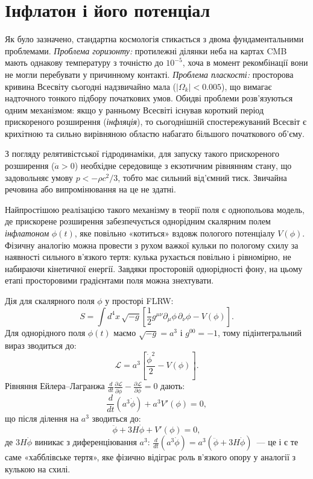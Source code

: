 \documentclass[12pt, a4paper]{article}
\begin{document}
\section{Інфлатон і його потенціал}
\label{sec:inflaton}

Як було зазначено, стандартна космологія стикається
з двома фундаментальними проблемами. \emph{Проблема горизонту:}
протилежні ділянки неба на картах CMB мають однакову температуру
з точністю до $10^{-5}$, хоча в момент рекомбінації вони не могли
перебувати у причинному контакті. \emph{Проблема пласкості:}
просторова кривина Всесвіту сьогодні надзвичайно мала
($|\Omega_k| < 0.005$), що вимагає надточного тонкого підбору
початкових умов. Обидві проблеми розв'язуються одним механізмом:
якщо у ранньому Всесвіті існував короткий період прискореного
розширення (\emph{інфляція}), то сьогоднішній спостережуваний
Всесвіт є крихітною та сильно вирівняною областю набагато більшого
початкового об'єму.

З погляду релятивістської гідродинаміки, для запуску такого прискореного
розширення ($\ddot{a} > 0$) необхідне середовище з екзотичним рівнянням
стану, що задовольняє умову $p < -\rho c^2 / 3$, тобто має сильний
від'ємний тиск. Звичайна речовина або випромінювання на це не здатні.

Найпростішою реалізацією такого механізму в теорії поля є однопольова
модель, де прискорене розширення забезпечується однорідним скалярним
полем \emph{інфлатоном} $\phi(t)$, яке повільно «котиться» вздовж
пологого потенціалу $V(\phi)$. Фізичну аналогію можна провести з
рухом важкої кульки по пологому схилу за наявності сильного
в'язкого тертя: кулька рухається повільно і рівномірно, не
набираючи кінетичної енергії. Завдяки просторовій однорідності
фону, на цьому етапі просторовими градієнтами поля можна знехтувати.

Дія для скалярного поля $\phi$ у просторі FLRW:
\begin{equation}\label{eq:inflaton_action}
  S = \int d^4x\,\sqrt{-g}\left[\frac{1}{2}g^{\mu\nu}\partial_\mu\phi\,\partial_\nu\phi - V(\phi)\right].
\end{equation}
Для однорідного поля $\phi(t)$ маємо $\sqrt{-g} = a^3$ і $g^{00} = -1$,
тому підінтегральний вираз зводиться до:
\begin{equation*}
  \mathcal{L} = a^3\!\left[\frac{\dot{\phi}^2}{2} - V(\phi)\right].
\end{equation*}
Рівняння Ейлера--Лагранжа $\frac{d}{dt}\frac{\partial\mathcal{L}}{\partial\dot{\phi}} - \frac{\partial\mathcal{L}}{\partial\phi} = 0$ дають:
\begin{equation*}
  \frac{d}{dt}\!\left(a^3\dot{\phi}\right) + a^3 V'(\phi) = 0,
\end{equation*}
що після ділення на $a^3$ зводиться до:
\begin{equation}\label{eq:klein_gordon}
    \ddot{\phi} +3H\dot{\phi} + V'(\phi) = 0,
\end{equation}
де $3H\dot{\phi}$ виникає з диференціювання $a^3$:
$\frac{d}{dt}(a^3\dot{\phi}) = a^3(\ddot{\phi} + 3H\dot{\phi})$~---
це і є те саме «хабблівське тертя», яке фізично відіграє роль
в'язкого опору у аналогії з кулькою на схилі.
\end{document}
